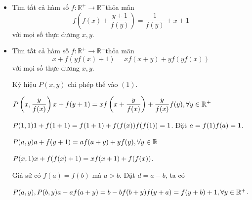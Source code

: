 \documentclass[11pt]{scrartcl}
\begin{document}
\begin{itemize}[label=, leftmargin=0em, itemsep=0.5em]
\begin{sol}
\begin{proof}
            Với $m,n \in \bb{Z^+}$, thay $P\left(m,\frac{n}{m}\right)$ ta được 
            \[
                    f(nm^2 + m) = m^3 + f\left(\frac{m}{n}\right) + f(m) \lra f\left(\frac{m}{n}\right) = \frac{m}{n}, \forall m,n \in \bb{Z^+}
            \]
        \end{proof}
        Khi này, với mọi số thực $x > 0$, ta chọn dãy $(u_n)$ thỏa mãn $u_n = \frac{\lfloor nx \rfloor}{n}, \forall n \in \bb{Z^+}$. Khi này ta có 
        \[
            \frac{nx - 1}{n} <  \frac{\lfloor nx \rfloor}{n} < \frac{nx + 1}{n} 
        \]
        Vì $f$ liên tục trên $\bb{R^+}$ nên
        \[
           \dlim \frac{nx - 1}{n} <\dlim u_n < \dlim\frac{nx + 1}{n} \ra \dlim u_n = x
        \]
        Từ $(4)$ thay $x = u_n$ ta được 
        \[
            \dlim f(u_n) = f(\dlim u_n) = \dlim u_n = x 
        \]
        Vậy hàm số duy nhất thỏa mãn là $\boxed{f(x) =x ,\xro}$.
    \end{sol}
    \item \begin{bt}
         Tìm tất cả hàm số $f: \mathbb{R}^{+} \rightarrow \mathbb{R}^{+}$thỏa mãn
        $$
        f\left(f(x)+\frac{y+1}{f(y)}\right)=\frac{1}{f(y)}+x+1
        $$
        với mọi số thực dương $x, y$.
    \end{bt}
    \item \begin{bt}
         Tìm tất cả hàm số $f: \mathbb{R}^{+} \rightarrow \mathbb{R}^{+}$thỏa mãn
        $$
        x+f(y f(x)+1)=x f(x+y)+y f(y f(x))
        $$
        với mọi số thực dương $x, y$.
    \end{bt}
    \begin{sol}
        Ký hiệu $P(x,y)$ chỉ phép thế vào $(1)$.
    
    
        $P\left(x,\frac{y}{f(x)}\right) \ra x + f(y + 1) = xf\left(x + \frac{y}{f(x)}\right) + \frac{y}{f(x)}f(y),\yro$

        $P(1,1) \ra 1 + f(1 + 1) = f(1 + 1) + f(f(x)) \ra f(f(1)) = 1 $. Đặt $a = f(1) \ra f(a) = 1$.

        $P(a,y) \ra a + f(y + 1) = af(a + y) + yf(y),\yr$

        $P(x,1) \ra x + f(f(x) + 1) = xf(x + 1) + f(f(x))$.

        Giả sử có $f(a)=f(b)$ mà $a > b$. Đặt $d = a - b$, ta có 
        
        $P(a,y),P(b,y) \ra a - af(a + y) = b - bf(b + y) \lra f(y + a) = f(y + b) +1,\yro$.


\end{sol}
\end{itemize}
\end{document}
